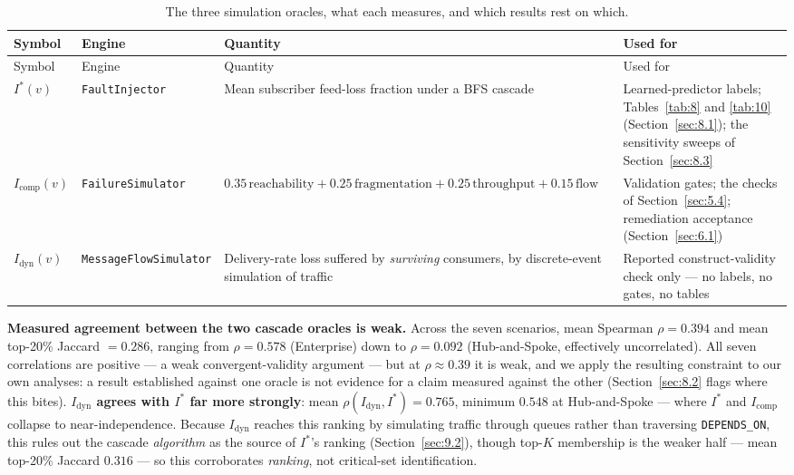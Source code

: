 \begin{longtable}[]{@{}
  >{\raggedright\arraybackslash}p{}
  >{\raggedright\arraybackslash}p{}
  >{\raggedright\arraybackslash}p{}
  >{\raggedright\arraybackslash}p{}@{}}
\caption{The three simulation oracles, what each measures, and which results rest on which.\label{tab:6}}\tabularnewline
\toprule
Symbol & Engine & Quantity & Used for \\
\midrule
\endfirsthead
\toprule
Symbol & Engine & Quantity & Used for \\
\midrule
\endhead
\(I^*(v)\) & \texttt{FaultInjector} & Mean subscriber feed-loss fraction under a BFS cascade & Learned-predictor labels; Tables~\ref{tab:8} and \ref{tab:10} (Section~\ref{sec:8.1}); the sensitivity sweeps of Section~\ref{sec:8.3} \\
\(I_{\text{comp}}(v)\) & \texttt{FailureSimulator} & \(0.35\,\text{reachability} + 0.25\,\text{fragmentation} + 0.25\,\text{throughput} + 0.15\,\text{flow}\) & Validation gates; the checks of Section~\ref{sec:5.4}; remediation acceptance (Section~\ref{sec:6.1}) \\
\(I_{\text{dyn}}(v)\) & \texttt{MessageFlowSimulator} & Delivery-rate loss suffered by \emph{surviving} consumers, by discrete-event simulation of traffic & Reported construct-validity check only --- no labels, no gates, no tables \\
\bottomrule
\end{longtable}

\textbf{Measured agreement between the two cascade oracles is weak.} Across the seven scenarios, mean
Spearman \(\rho = 0.394\) and mean top-20\% Jaccard \(= 0.286\), ranging from \(\rho = 0.578\)
(Enterprise) down to \(\rho = 0.092\) (Hub-and-Spoke, effectively uncorrelated). All seven
correlations are positive --- a weak convergent-validity argument --- but at \(\rho \approx 0.39\) it
is weak, and we apply the resulting constraint to our own analyses: a result established against one
oracle is not evidence for a claim measured against the other (Section~\ref{sec:8.2} flags where this
bites). \textbf{\(I_{\text{dyn}}\) agrees with \(I^*\) far more strongly}: mean
\(\rho(I_{\text{dyn}}, I^*) = 0.765\), minimum \(0.548\) at Hub-and-Spoke --- where \(I^*\) and
\(I_{\text{comp}}\) collapse to near-independence. Because \(I_{\text{dyn}}\) reaches this ranking by
simulating traffic through queues rather than traversing \texttt{DEPENDS\_ON}, this rules out the
cascade \emph{algorithm} as the source of \(I^*\)'s ranking (Section~\ref{sec:9.2}), though top-\(K\)
membership is the weaker half --- mean top-20\% Jaccard \(0.316\) --- so this corroborates
\emph{ranking}, not critical-set identification.

